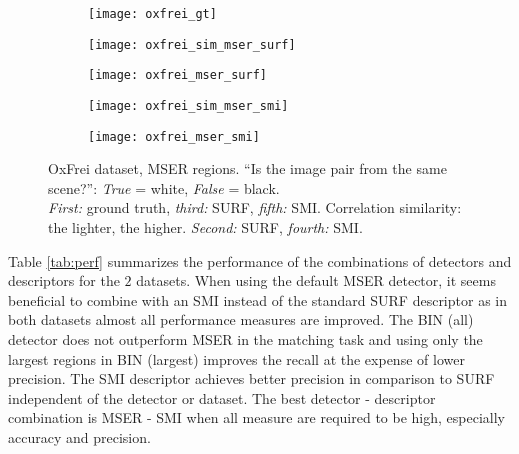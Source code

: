 \documentclass[a4paper,11pt]{article}
\begin{document}
\begin{figure}[h]
 \vspace{-10pt} 
\begin{center}
\begin{subfigure}[b]{0.18\textwidth}
  \texttt{[image: oxfrei\_gt]}
\end{subfigure}
\begin{subfigure}[b]{0.18\textwidth}
\texttt{[image: oxfrei\_sim\_mser\_surf]}
\end{subfigure}
\begin{subfigure}[b]{0.18\textwidth}
  \texttt{[image: oxfrei\_mser\_surf]}
\end{subfigure}
\begin{subfigure}[b]{0.18\textwidth}
\texttt{[image: oxfrei\_sim\_mser\_smi]}
\end{subfigure}
\begin{subfigure}[b]{0.18\textwidth}
  \texttt{[image: oxfrei\_mser\_smi]}
\end{subfigure}
\end{center}
\vspace{-20pt}

\caption{\small  OxFrei dataset, MSER regions. ``Is the image pair from the same scene?'': {\em True} = white, {\em False} = black. \\
{\em First:} ground truth, {\em third:} SURF, {\em fifth:} SMI. Correlation similarity: the lighter, the higher. {\em Second:} SURF, {\em fourth:} SMI. }
\label{fig:matching2}
  \vspace{-12pt}
\end{figure}


Table \ref{tab:perf} summarizes the performance of the combinations of detectors and descriptors for the $2$ datasets. When using the default MSER detector, it seems beneficial to combine with an SMI instead of the standard SURF descriptor as in both datasets almost all performance measures are improved. The BIN (all) detector does not outperform MSER in the matching task and using only the largest regions in BIN (largest) improves the recall at the expense of lower precision. The SMI descriptor achieves better precision in comparison to SURF independent of the detector or dataset. The best detector - descriptor combination is MSER - SMI when all measure are required to be high, especially accuracy and precision.
\end{document}

